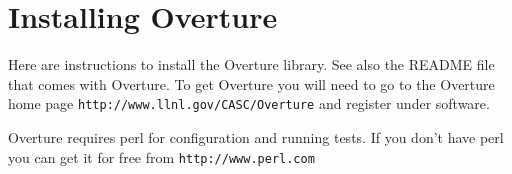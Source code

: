 \documentclass{article}
\begin{document}
% 

\clearpage
\section{Installing Overture}\label{sec:installingOverture}

Here are instructions to install the Overture library. See also the README file that comes with Overture.
To get Overture you will need to go to the Overture home page \texttt{http://www.llnl.gov/CASC/Overture}
and register under software.

Overture requires perl for configuration and running tests. If you don't have perl you
can get it for free from \texttt{http://www.perl.com}
\end{document}
